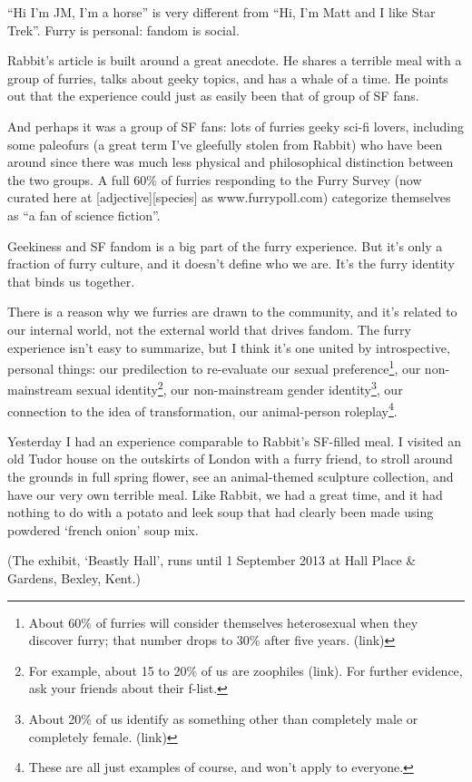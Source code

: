 ``Hi I'm JM, I'm a horse'' is very different from ``Hi, I'm Matt and I like Star Trek''. Furry is personal: fandom is social.

Rabbit's article is built around a great anecdote. He shares a terrible meal with a group of furries, talks about geeky topics, and has a whale of a time. He points out that the experience could just as easily been that of group of SF fans.

And perhaps it was a group of SF fans: lots of furries geeky sci-fi lovers, including some paleofurs (a great term I've gleefully stolen from Rabbit) who have been around since there was much less physical and philosophical distinction between the two groups. A full 60\% of furries responding to the Furry Survey (now curated here at [adjective][species] as www.furrypoll.com) categorize themselves as ``a fan of science fiction''.

Geekiness and SF fandom is a big part of the furry experience. But it's only a fraction of furry culture, and it doesn't define who we are. It's the furry identity that binds us together.

There is a reason why we furries are drawn to the community, and it's related to our internal world, not the external world that drives fandom. The furry experience isn't easy to summarize, but I think it's one united by introspective, personal things: our predilection to re-evaluate our sexual preference\footnote{About 60\% of furries will consider themselves heterosexual when they discover furry; that number drops to 30\% after five years. (link)}, our non-mainstream sexual identity\footnote{For example, about 15 to 20\% of us are zoophiles (link). For further evidence, ask your friends about their f-list.}, our non-mainstream gender identity\footnote{About 20\% of us identify as something other than completely male or completely female. (link)}, our connection to the idea of transformation, our animal-person roleplay\footnote{These are all just examples of course, and won't apply to everyone.}.

Yesterday I had an experience comparable to Rabbit's SF-filled meal. I visited an old Tudor house on the outskirts of London with a furry friend, to stroll around the grounds in full spring flower, see an animal-themed sculpture collection, and have our very own terrible meal. Like Rabbit, we had a great time, and it had nothing to do with a potato and leek soup that had clearly been made using powdered `french onion' soup mix.

(The exhibit, `Beastly Hall', runs until 1 September 2013 at Hall Place \& Gardens, Bexley, Kent.)

